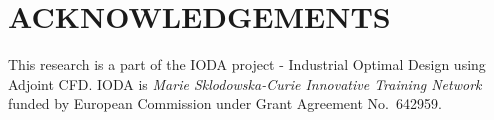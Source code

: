 \documentclass[9pt,academicons]{article}
\begin{document}
\section*{ACKNOWLEDGEMENTS}
This research is a part of the IODA project - Industrial Optimal Design using Adjoint CFD. IODA is \textit{Marie Sklodowska-Curie Innovative Training Network} funded by European Commission under Grant Agreement No.~642959.

\bigskip








\bigskip
\end{document}

